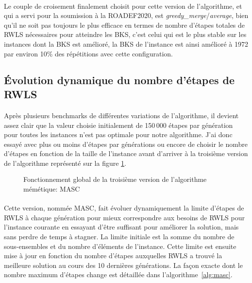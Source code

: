 \documentclass[a4paper,11pt,twoside,french,report]{../common/simplem}
\begin{document}
				\paragraph*{}
					Le couple de croisement finalement choisit pour cette version de l'algorithme, et qui a servi pour la soumission à la \acrshort{ROADEF2020}, est \textit{greedy\_merge}/\textit{average}, bien qu'il ne soit pas toujours le plus efficace en termes de nombre d'étapes totales de \gls{RWLS} nécessaires pour atteindre les \gls{BKS}, c'est celui qui est le plus stable sur les instances dont la \gls{BKS} est amélioré, la \gls{BKS} de l'instance  est ainsi amélioré à 1972 par environ 10\% des répétitions avec cette configuration.
			\subsection{Évolution dynamique du nombre d'étapes de \acrshort{RWLS}}
				\paragraph*{}
					Après plusieurs benchmarks de différentes variations de l'algorithme, il devient assez clair que la valeur choisie initialement de 150\,000 étapes par génération pour toutes les instances n'est pas optimale pour notre algorithme. J'ai donc essayé avec plus ou moins d'étapes par générations ou encore de choisir le nombre d'étapes en fonction de la taille de l'instance avant d'arriver à la troisième version de l'algorithme représenté sur la figure \ref{fig:memetic_algorithm_v3}.
				\begin{figure}[H]
					\centering%
					\caption{Fonctionnement global de la troisième version de l'algorithme mémétique: \acrshort{MASC}}%
					\label{fig:memetic_algorithm_v3}%
				\end{figure}
				\paragraph*{}
					Cette version, nommée \gls{MASC}, fait évoluer dynamiquement la limite d'étapes de \gls{RWLS} à chaque génération pour mieux correspondre aux besoins de \gls{RWLS} pour l'instance courante en essayant d'être suffisant pour améliorer la solution, mais sans perdre de temps à stagner. La limite initiale est la somme du nombre de sous-ensembles et du nombre d'éléments de l'instance. Cette limite est ensuite mise à jour en fonction du nombre d'étapes auxquelles \gls{RWLS} a trouvé la meilleure solution au cours des 10 dernières générations. La façon exacte dont le nombre maximum d'étapes change est détaillée dans l'algorithme~\ref{alg:masc}.
\end{document}

